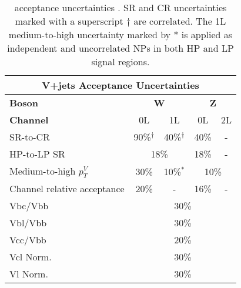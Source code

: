 \begin{table}[!htbp] 
  \footnotesize\centering
  \setlength{\tabcolsep}{0.5em} %
  \begin{tabular}{l|c|c|c|c}
      \toprule\hline
      \multicolumn{5}{c}{V+jets Acceptance Uncertainties}            
      \\ \hline
      \textbf{Boson}      & \multicolumn{2}{c|}{\textbf{W}} & \multicolumn{2}{c}{\textbf{Z}} 
      \\ \hline
      \textbf{Channel}    & 0L          & 1L         & 0L         & 2L          
      \\ \hline
      SR-to-CR               &   90\%$^\dagger$         & 40\%$^\dagger$ &      40\%     & -         
      \\ \hline
      HP-to-LP SR               & \multicolumn{2}{c|}{18\%}             &   18\%      & -         
      \\ \hline
      Medium-to-high $p_T^V$ &   30\%      & 10\%$^*$       & \multicolumn{2}{c}{10\%}          
      \\ \hline
      Channel relative acceptance             &   20\%      &   -        &    16\%    & -
      \\ \hline
      Vbc/Vbb             & \multicolumn{4}{c}{30\%}                       
      \\ \hline
      Vbl/Vbb             & \multicolumn{4}{c}{30\%}                       
      \\ \hline
      Vcc/Vbb             & \multicolumn{4}{c}{20\%}                       
      \\ \hline
      Vcl Norm.           & \multicolumn{4}{c}{30\%}                       
      \\ \hline
      Vl Norm.            & \multicolumn{4}{c}{30\%}                       
      \\ \hline\bottomrule
  \end{tabular}
  \caption{
    \Vjets acceptance uncertainties \cite{Dao:2688371}.
    \Wjets SR and CR uncertainties marked with a superscript $\dagger$ are correlated.
    The 1L \Wjets medium-to-high \pTV uncertainty marked by $*$ is applied as independent and uncorrelated NPs in both HP and LP signal regions.
  }
  \label{tab:Vjets acceptance uncerts}
\end{table}